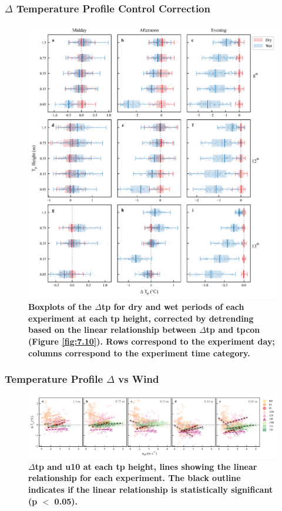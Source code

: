 \documentclass[final,3p,times,authoryear]{elsarticle}
\begin{document}
\subsubsection{$\Delta$ Temperature Profile Control Correction}\label{sec:appendix7.5.3}
\begin{figure}
\centering
\includegraphics[trim={0 0 0 0},clip,scale=1.0]{pict040.png}
\caption{\bf Boxplots of the $\Delta$\gls{tp} for dry and wet periods of each experiment at each \gls{tp} height, corrected by detrending based on the linear relationship between $\Delta$\gls{tp} and \gls{tpcon} (Figure \ref{fig:7.10}). Rows correspond to the experiment day; columns correspond to the experiment time category.}
 \label{fig:7.11}
\end{figure}
\clearpage


\subsubsection{Temperature Profile $\Delta$ vs Wind}\label{sec:appendix7.5.4}

\begin{figure}
\centering
\includegraphics[trim={0 0 0 0},clip,scale=1.0]{pict041.png}
\caption{\bf $\Delta$\gls{tp} and \gls{u10} at each \gls{tp} height, lines showing the linear relationship for each experiment. The black outline indicates if the linear relationship is statistically significant (\gls{p} $<$ 0.05).}
 \label{fig:7.12}
\end{figure}
\clearpage
\end{document}
